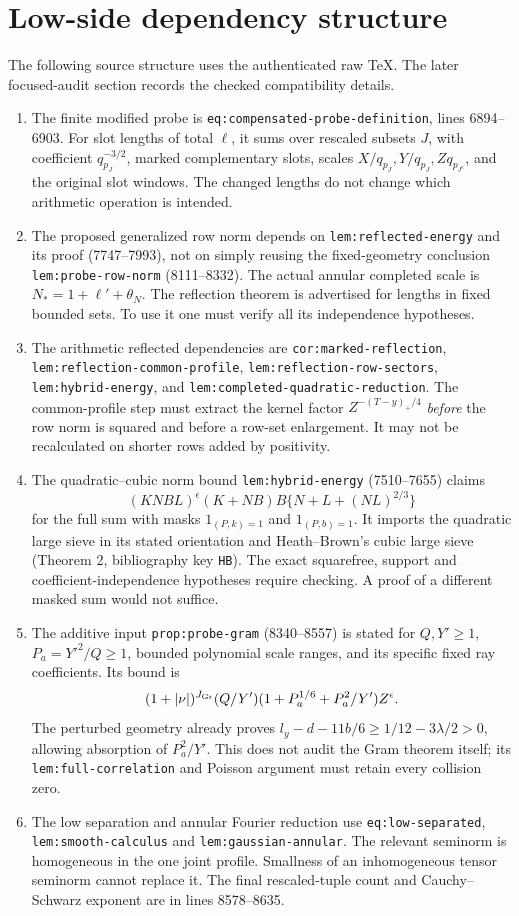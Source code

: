 \documentclass[12pt]{article}
\begin{document}
\section{Low-side dependency structure}
The following source structure uses the authenticated raw TeX.
The later focused-audit section records the checked compatibility details.
\begin{enumerate}
\item The finite modified probe is
\nolinkurl{eq:compensated-probe-definition}, lines 6894--6903.
For slot lengths of total \(\ell\), it sums over rescaled subsets
\(J\), with coefficient \(q_{p_J}^{-3/2}\), marked complementary
slots, scales \(X/q_{p_J},Y/q_{p_J},Zq_{p_{J^c}}\), and the
original slot windows.  The changed lengths do not change which
arithmetic operation is intended.
\item The proposed generalized row norm depends on
\nolinkurl{lem:reflected-energy} and its proof (7747--7993),
not on simply reusing the fixed-geometry conclusion
\nolinkurl{lem:probe-row-norm} (8111--8332).
The actual annular completed scale is
\(N_*=1+\ell'+\theta_N\).
The reflection theorem is advertised for lengths in fixed bounded
sets.  To use it one must verify all its independence hypotheses.
\item The arithmetic reflected dependencies are
\nolinkurl{cor:marked-reflection},
\nolinkurl{lem:reflection-common-profile},
\nolinkurl{lem:reflection-row-sectors},
\nolinkurl{lem:hybrid-energy},
and \nolinkurl{lem:completed-quadratic-reduction}.
The common-profile step must extract the kernel factor
\(Z^{-(T-y)_+/4}\) \emph{before} the row norm is squared and
before a row-set enlargement.  It may not be recalculated on
shorter rows added by positivity.
\item The quadratic--cubic norm bound
\nolinkurl{lem:hybrid-energy} (7510--7655) claims
\[
 (KNBL)^\epsilon(K+NB)B\{N+L+(NL)^{2/3}\}
\]
for the full sum with masks \(1_{(P,k)=1}\) and
\(1_{(P,b)=1}\).  It imports the quadratic large sieve in its
stated orientation and Heath--Brown's cubic large sieve
(Theorem 2, bibliography key \texttt{HB}).  The exact squarefree,
support and coefficient-independence hypotheses require checking.
A proof of a different masked sum would not suffice.
\item The additive input
\nolinkurl{prop:probe-gram} (8340--8557) is stated for
\(Q,Y'\ge1\), \(P_a=Y'^2/Q\ge1\), bounded polynomial scale
ranges, and its specific fixed ray coefficients.  Its bound is
\[
 (1+|\nu|)^{J_{\rm Gr}}(Q/Y')
          (1+P_a^{1/6}+P_a^2/Y')Z^\epsilon .
\]
The perturbed geometry already proves
\(l_y-d-11b/6\ge1/12-3\lambda/2>0\), allowing absorption of
\(P_a^2/Y'\).  This does not audit the Gram theorem itself;
its \nolinkurl{lem:full-correlation} and Poisson argument must
retain every collision zero.
\item The low separation and annular Fourier reduction use
\nolinkurl{eq:low-separated}, \nolinkurl{lem:smooth-calculus}
and \nolinkurl{lem:gaussian-annular}.
The relevant seminorm is homogeneous in the one joint profile.
Smallness of an inhomogeneous tensor seminorm cannot replace it.
The final rescaled-tuple count and Cauchy--Schwarz exponent are
in lines 8578--8635.
\end{enumerate}
\end{document}
